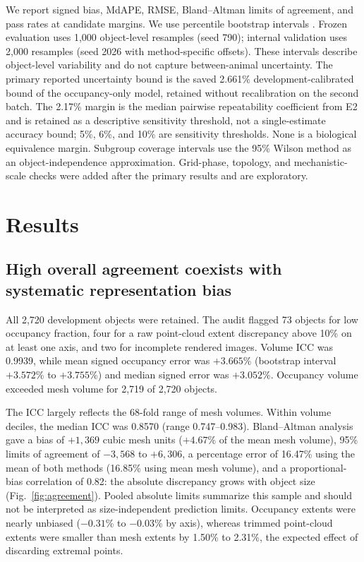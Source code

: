 \documentclass[journal]{IEEEtran}
\begin{document}
We report signed bias, MdAPE, RMSE, Bland--Altman limits of agreement, and pass rates at candidate margins. We use percentile bootstrap intervals \cite{ref27}. Frozen evaluation uses 1,000 object-level resamples (seed 790); internal validation uses 2,000 resamples (seed 2026 with method-specific offsets). These intervals describe object-level variability and do not capture between-animal uncertainty. The primary reported uncertainty bound is the saved 2.661\% development-calibrated bound of the occupancy-only model, retained without recalibration on the second batch. The 2.17\% margin is the median pairwise repeatability coefficient from E2 and is retained as a descriptive sensitivity threshold, not a single-estimate accuracy bound; 5\%, 6\%, and 10\% are sensitivity thresholds. None is a biological equivalence margin. Subgroup coverage intervals use the 95\% Wilson method as an object-independence approximation. Grid-phase, topology, and mechanistic-scale checks were added after the primary results and are exploratory.

\section{Results}

\subsection{High overall agreement coexists with systematic representation bias}

All 2,720 development objects were retained. The audit flagged 73 objects for low occupancy fraction, four for a raw point-cloud extent discrepancy above 10\% on at least one axis, and two for incomplete rendered images. Volume ICC was 0.9939, while mean signed occupancy error was $+3.665$\% (bootstrap interval $+3.572$\% to $+3.755$\%) and median signed error was $+3.052$\%. Occupancy volume exceeded mesh volume for 2,719 of 2,720 objects.

The ICC largely reflects the 68-fold range of mesh volumes. Within volume deciles, the median ICC was 0.8570 (range 0.747--0.983). Bland--Altman analysis gave a bias of $+1{,}369$ cubic mesh units ($+4.67$\% of the mean mesh volume), 95\% limits of agreement of $-3{,}568$ to $+6{,}306$, a percentage error of 16.47\% using the mean of both methods (16.85\% using mean mesh volume), and a proportional-bias correlation of 0.82: the absolute discrepancy grows with object size (Fig.~\ref{fig:agreement}). Pooled absolute limits summarize this sample and should not be interpreted as size-independent prediction limits. Occupancy extents were nearly unbiased ($-0.31$\% to $-0.03$\% by axis), whereas trimmed point-cloud extents were smaller than mesh extents by 1.50\% to 2.31\%, the expected effect of discarding extremal points.
\end{document}
